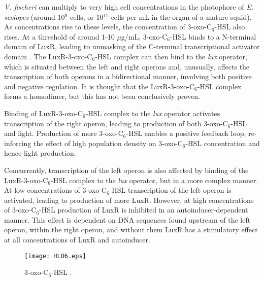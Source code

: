\textit{V. fischeri} can multiply to very high cell concentrations in the photophore of \textit{E. scolopes} (around 10$^9$ cells\cite{Ruby1993, Ruby1998, Nyholm1998}, or 10$^{11}$ cells per mL \cite{Miller2001} in the organ of a mature squid). As concentrations rise to these levels, the concentration of 3-oxo-C$_6$-HSL  also rises. At a threshold of around 1-10 $\mu$g/mL\cite{Eberhard1981}, 3-oxo-C$_6$-HSL  binds to a N-terminal domain of LuxR\cite{Hanzelka1995}, leading to unmasking of the C-terminal transcriptional activator domain \cite{Choi1991,Choi1992}. The LuxR-3-oxo-C$_6$-HSL complex can then bind to the \textit{lux} operator, which is situated between the left and right operons and, unusually, affects the transcription of both operons in a bidirectional manner, involving both positive and negative regulation\cite{Shadel1991}. It is thought that the LuxR-3-oxo-C$_6$-HSL complex forms a homodimer\cite{Choi1992a}, but this has not been conclusively proven\cite{Antunes2008,Miyashiro2012}.

Binding of LuxR-3-oxo-C$_6$-HSL complex to the \textit{lux} operator activates transcription of the right operon, leading to production of both 3-oxo-C$_6$-HSL  and light. Production of more 3-oxo-C$_6$-HSL  enables a positive feedback loop, re-inforcing the effect of high population density on 3-oxo-C$_6$-HSL  concentration and hence light production.

Concurrently, transcription of the left operon is also affected by binding of the LuxR-3-oxo-C$_6$-HSL complex to the \textit{lux} operator, but in a more complex manner. At low concentrations of 3-oxo-C$_6$-HSL  transcription of the left operon is activated, leading to production of more LuxR.
However, at high concentrations of 3-oxo-C$_6$-HSL  production of LuxR is inhibited in an autoinducer-dependent manner\cite{Dunlap1989}. This effect is dependent on DNA sequences found upstream of the left operon, within the right operon, and without them LuxR has a stimulatory effect at all concentrations of LuxR and autoinducer.




\begin{figure}[H]
	\begin{center}
		\texttt{[image: HLO6.eps]}
		\caption{3-oxo-C$_6$-HSL . \label{fig:HLO6}}
	\end{center}
\end{figure}

